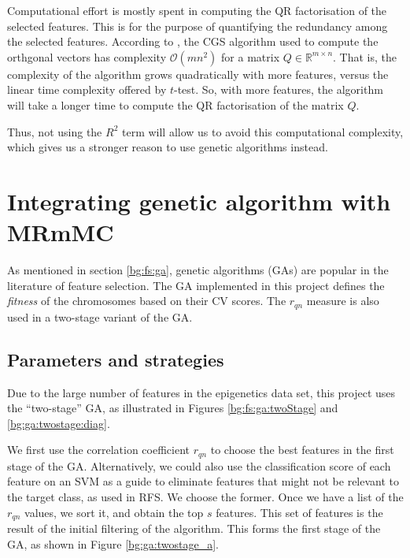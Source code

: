 \documentclass[12pt, twoside, a4paper]{report}
\begin{document}
Computational effort is mostly spent in computing the QR factorisation of the selected features. This is for the purpose of quantifying the redundancy among the selected features. According to \cite{RefWorks:253}, the CGS algorithm used to compute the orthgonal vectors has complexity $\mathcal{O}(mn^2)$ for a matrix $Q \in \mathbb{R}^{m \times n}$. That is, the complexity of the algorithm grows quadratically with more features, versus the linear time complexity offered by $t$-test. So, with more features, the algorithm will take a longer time to compute the QR factorisation of the matrix $Q$.

Thus, not using the $R^2$ term will allow us to avoid this computational complexity, which gives us a stronger reason to use genetic algorithms instead.




\section{Integrating genetic algorithm with MRmMC} \label{ga:mrmmc}

As mentioned in section \ref{bg:fs:ga}, genetic algorithms (GAs) are popular in the literature of feature selection. The GA implemented in this project defines the \textit{fitness} of the chromosomes based on their CV scores. The $r_{qn}$ measure is also used in a two-stage variant of the GA.


\subsection{Parameters and strategies}
\label{body:ga:params}

Due to the large number of features in the epigenetics data set, this project uses the ``two-stage'' GA, as illustrated in Figures \ref{bg:fs:ga:twoStage} and \ref{bg:ga:twostage:diag}.

We first use the correlation coefficient $r_{qn}$ to choose the best features in the first stage of the GA. Alternatively, we could also use the classification score of each feature on an SVM as a guide to eliminate features that might not be relevant to the target class, as used in RFS. We choose the former. Once we have a list of the $r_{qn}$ values, we sort it, and obtain the top $s$ features. This set of features is the result of the initial filtering of the algorithm. This forms the first stage of the GA, as shown in Figure \ref{bg:ga:twostage_a}.
\end{document}
